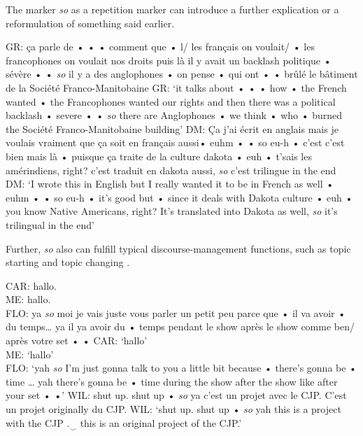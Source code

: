 \documentclass[output=paper]{langscibook}
\begin{document}
\noindent
The marker \textit{so} as a repetition marker can introduce a further explication  or a reformulation  of something said earlier.

\begin{exe}
    \ex\label{hennecke:ex:29} GR: ça parle de • • • comment que • l/ les français on voulait/ • les francophones on voulait nos droits puis là il y avait un backlash politique • sévère • • \textit{so} il y a des anglophones • on pense • qui ont • • brûlé le bâtiment de la Société Franco-Manitobaine
    \glt GR: ‘it talks about • • • how • the French wanted • the Francophones wanted our rights and then there was a political backlash • severe • • \textit{so} there are Anglophones • we think • who •  burned the Société Franco-Manitobaine building’
    \ex\label{hennecke:ex:30} DM: Ça j’ai écrit en anglais mais je voulais vraiment que ça soit en français aussi• euhm • • so eu-h • c’est c’est bien mais là • puisque ça traite de la culture dakota • euh • t’sais les amérindiens, right? c’est traduit en dakota aussi, \textit{so} c’est trilingue in the end
    \glt DM: ‘I wrote this in English but I really wanted it to be in French as well • euhm • • so eu-h • it’s good but • since it deals with Dakota culture • euh • you know Native Americans, right? It’s translated into Dakota as well, \textit{so} it’s trilingual in the end’
\end{exe}

\noindent
Further, \textit{so} also can fulfill typical discourse-management functions, such as topic starting  and topic changing .

\begin{exe}
    \ex\label{hennecke:ex:31} CAR: hallo. \\
    ME: hallo. \\
    FLO: ya \textit{so} moi je vais juste vous parler un petit peu parce que • il va avoir • du temps… ya il ya avoir du • temps pendant le show après le show comme ben/ après votre set • •
    \glt CAR: ‘hallo’ \\
    ME: ‘hallo’ \\
    FLO: ‘yah \textit{so} I’m just gonna talk to you a little bit because • there’s gonna be • time … yah there’s gonna be • time during the show after the show like after your set • •’
    \ex\label{hennecke:ex:32} WIL: shut up. shut up • \textit{so} ya c’est un projet avec le CJP. C’est un projet originally du CJP.
    \glt WIL: ‘shut up. shut up • \textit{so} yah this is a project with the CJP .$_\smile$ this is an original project of the CJP.’
\end{exe}
\end{document}
